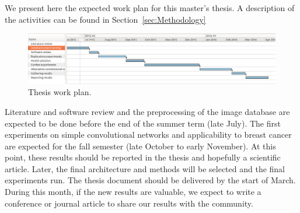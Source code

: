 We present here the expected work plan for this master's thesis. A description of the activities can be found in Section~\ref{sec:Methodology}
\begin{figure}[h]
	\centering
	\includegraphics[width = \textwidth]{plots/workplan.png}
	\caption[Thesis Work Plan]{Thesis work plan.}
	\label{fig:workplan}
\end{figure}

Literature and software review and the preprocessing of the image database are expected to be done before the end of the summer term (late July). The first experiments on simple convolutional networks and applicability to breast cancer are expected for the fall semester (late October to early November). At this point, these results should be reported in the thesis and hopefully a scientific article. Later, the final architecture and methods will be selected and the final experiments run. The thesis document should be delivered by the start of March. During this month, if the new results are valuable, we expect to write a conference or journal article to share our results with the community.

